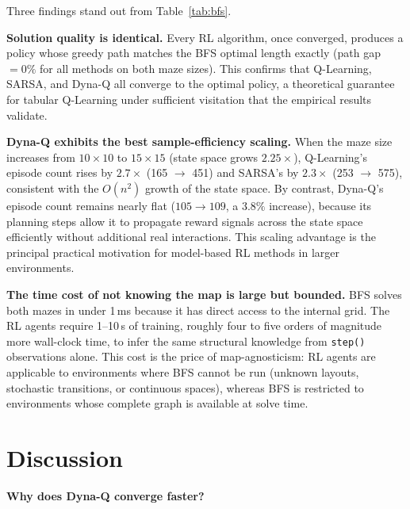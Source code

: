 \documentclass[11pt]{article}
\begin{document}
Three findings stand out from Table~\ref{tab:bfs}.

\textbf{Solution quality is identical.} Every RL algorithm, once
converged, produces a policy whose greedy path matches the BFS
optimal length exactly (path gap $= 0\%$ for all methods on both maze
sizes). This confirms that Q-Learning, SARSA, and Dyna-Q all converge to
the optimal policy, a theoretical guarantee for tabular Q-Learning under
sufficient visitation \cite{watkins1992} that the empirical results
validate.

\textbf{Dyna-Q exhibits the best sample-efficiency scaling.}
When the maze size increases from $10\times10$ to $15\times15$ (state
space grows $2.25\times$), Q-Learning's episode count rises by
$2.7\times$ (165 $\to$ 451) and SARSA's by $2.3\times$ (253 $\to$ 575),
consistent with the $O(n^2)$ growth of the state space. By contrast,
Dyna-Q's episode count remains nearly flat ($105 \to 109$, a $3.8\%$
increase), because its planning steps allow it to propagate reward
signals across the state space efficiently without additional real
interactions. This scaling advantage is the principal practical motivation
for model-based RL methods in larger environments.

\textbf{The time cost of not knowing the map is large but bounded.}
BFS solves both mazes in under 1\,ms because it has direct access to the
internal grid. The RL agents require 1--10\,s of training, roughly
four to five orders of magnitude more wall-clock time, to infer the
same structural knowledge from \texttt{step()} observations alone. This
cost is the price of map-agnosticism: RL agents are applicable to
environments where BFS cannot be run (unknown layouts, stochastic
transitions, or continuous spaces), whereas BFS is restricted to
environments whose complete graph is available at solve time.

\section{Discussion}
\label{sec:discussion}

\textbf{Why does Dyna-Q converge faster?}
\end{document}
